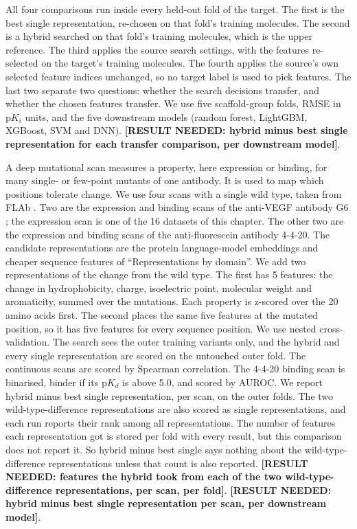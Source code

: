 All four comparisons run inside every held-out fold of the target. The first is the best single representation, re-chosen on that fold's training molecules. The second is a hybrid searched on that fold's training molecules, which is the upper reference. The third applies the source search settings, with the features re-selected on the target's training molecules. The fourth applies the source's own selected feature indices unchanged, so no target label is used to pick features. The last two separate two questions: whether the search decisions transfer, and whether the chosen features transfer. We use five scaffold-group folds, RMSE in $\mathrm{p}K_i$ units, and the five downstream models (random forest, LightGBM, XGBoost, SVM and DNN). \textbf{[RESULT NEEDED: hybrid minus best single representation for each transfer comparison, per downstream model]}.

A deep mutational scan measures a property, here expression or binding, for many single- or few-point mutants of one antibody. It is used to map which positions tolerate change. We use four scans with a single wild type, taken from FLAb \citep{Chungyoun2024}. Two are the expression and binding scans of the anti-VEGF antibody G6 \citep{Koenig2017}; the expression scan is one of the 16 datasets of this chapter. The other two are the expression and binding scans of the anti-fluorescein antibody 4-4-20. The candidate representations are the protein language-model embeddings and cheaper sequence features of ``Representations by domain''. We add two representations of the change from the wild type. The first has 5 features: the change in hydrophobicity, charge, isoelectric point, molecular weight and aromaticity, summed over the mutations. Each property is z-scored over the 20 amino acids first. The second places the same five features at the mutated position, so it has five features for every sequence position. We use nested cross-validation. The search sees the outer training variants only, and the hybrid and every single representation are scored on the untouched outer fold. The continuous scans are scored by Spearman correlation. The 4-4-20 binding scan is binarised, binder if its $\mathrm{p}K_d$ is above 5.0, and scored by AUROC. We report hybrid minus best single representation, per scan, on the outer folds. The two wild-type-difference representations are also scored as single representations, and each run reports their rank among all representations. The number of features each representation got is stored per fold with every result, but this comparison does not report it. So hybrid minus best single says nothing about the wild-type-difference representations unless that count is also reported. \textbf{[RESULT NEEDED: features the hybrid took from each of the two wild-type-difference representations, per scan, per fold]}. \textbf{[RESULT NEEDED: hybrid minus best single representation per scan, per downstream model]}.

